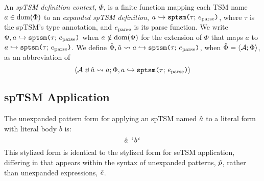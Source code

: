 {{{{\begin{enumerate}
An \emph{spTSM definition context}, $\Phi$, is a finite function mapping each TSM name $a \in \text{dom}(\Phi)$ to an \emph{expanded spTSM definition}, $a \hookrightarrow \texttt{sptsm}\texttt{(}\tau;\,e_\text{parse}\texttt{)}$, where $\tau$ is the spTSM's type annotation, and $e_\text{parse}$ is its parse function. We write $\Phi, a \hookrightarrow \texttt{sptsm}\texttt{(}\tau;\,e_\text{parse}\texttt{)}$ when $a \notin \text{dom}(\Phi)$ for the extension of $\Phi$ that maps $a$ to $a \hookrightarrow \texttt{sptsm}\texttt{(}\tau;\,e_\text{parse}\texttt{)}$. %
We define $\hat\Phi, \hat{a} \leadsto a \hookrightarrow \texttt{sptsm}\texttt{(}\tau;\,e_\text{parse}\texttt{)}$, when $\hat\Phi=\langle \mathcal{A}; \Phi \rangle$, as an abbreviation of \[\langle \mathcal{A} \uplus \hat{a} \leadsto a; \Phi, a \hookrightarrow \texttt{sptsm}\texttt{(}\tau;\,e_\text{parse}\texttt{)} \rangle\]
\end{enumerate}
\subsection{spTSM Application}\label{sec:uptsm-application}
The unexpanded pattern form for applying an spTSM named $\hat{a}$ to a literal form with literal body $b$ is:
\[
\utsmap{\tsmv}{b}
\] 
This stylized form is identical to the stylized form for seTSM application, differing in that appears within the syntax of unexpanded patterns, $\hat{p}$, rather than unexpanded expressions, ${\hat e}$. %

}}}}
